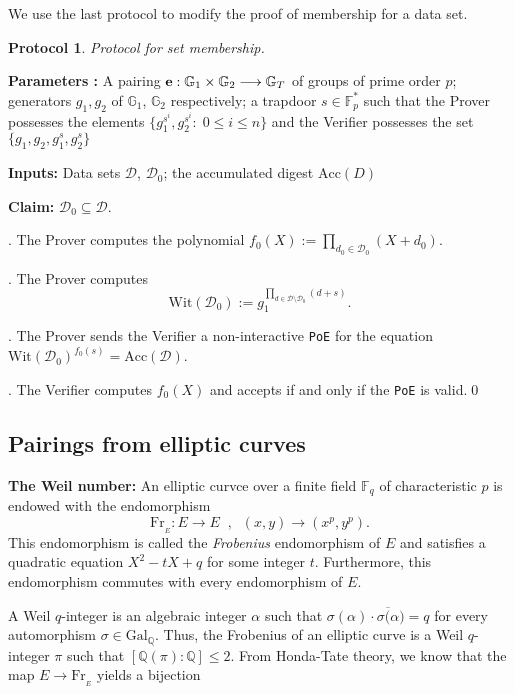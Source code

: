 \documentclass[11pt, lettersize, notitlepage, leqno, footskip=0.6cm]{article}
\newcommand{\bF}{\mathbb F}
\newcommand{\bq}{\mathbb Q}
\newcommand{\bFp}{\mathbb{F}_p}
\newcommand{\absq}{\mathrm{Gal}_{\bq}}
\newcommand{\lra}{\longrightarrow}
\newcommand{\mc}{\mathcal}
\newcommand{\mb}{\mathbb}
\newcommand{\mr}{\mathrm}
\newcommand{\al}{\alpha}
\newcommand{\ov}{\overline}
\newcommand{\sub}{\subseteq}
\newcommand{\vs}{\vspace{-2mm}}
\newcommand{\noin}{\noindent}
\newtheorem{Prot}[Thm]{Protocol}
\numberwithin{equation}{section}
\begin{document}
\noin We use the last protocol to modify the proof of membership for a data set.

\begin{Prot} Protocol for set membership.\end{Prot} \vspace{-0.3cm}

\noindent \textbf{Parameters :} A pairing ${\bf{e}}: \mb{G}_1\times \mb{G}_2\lra \mb{G}_T$ of groups of prime order $p$; generators $g_1, g_2$ of $\mb{G}_1$, $\mb{G}_2$ respectively; a trapdoor $s\in \bFp^*$ such that the Prover possesses the elements $\{g_1^{s^i}, g_2^{s^i}:\; 0\leq i\leq n \}$ and the Verifier possesses the set $\{g_1, g_2, g_1^s, g_2^s \}$ 

\noindent \textbf{Inputs:} Data sets $\mc{D}$, $\mc{D}_0$; the accumulated digest $\mr{Acc}(D)$

\noindent \textbf{Claim:} $\mc{D}_0\sub \mc{D}$.\vspace{0.1cm}

\normalfont \noin 1. The Prover computes the polynomial $f_0(X):= \prod\limits_{d_0\in \mc{D}_0}(X+d_0)$.

. The Prover computes $$\mr{Wit}(\mc{D}_0) := g_1^{\prod\limits_{d\in \mc{D}\setminus \mc{D}_0} (d+s)}.$$

. The Prover sends the Verifier a non-interactive \verb|PoE| for the equation $\mr{Wit}(\mc{D}_0)^{f_0(s)} = \mr{Acc}(\mc{D})$.

. The Verifier computes $f_0(X)$ and accepts if and only if the \verb|PoE| is valid.\qed \\


\subsection{\fontsize{11}{11}\selectfont Pairings from elliptic curves}



\noin \textbf{The Weil number:} An elliptic curvce over a finite field $\bF _q$ of characteristic $p$ is endowed with the endomorphism \vs $$\mr{Fr}_{_E} : E\lra E\;\;,\;\;(x,y)\lra (x^p, y^p) .$$ This endomorphism is called the \textit{Frobenius} endomorphism of $E$ and satisfies a quadratic equation $X^2 - tX + q$ for some integer $t$. Furthermore, this endomorphism commutes with every endomorphism of $E$.

A Weil $q$-integer is an algebraic integer $\al$ such that $\sigma(\al)\cdot \ov{\sigma(\al}) = q$ for every automorphism $\sigma\in \absq$. Thus, the Frobenius of an elliptic curve is a Weil $q$-integer $\pi$ such that $[\bq(\pi):\bq]\leq 2$. From Honda-Tate theory, we know that the map $E\lra \mr{Fr}_{_E}$ yields a bijection \vspace{-5mm}
\end{document}
